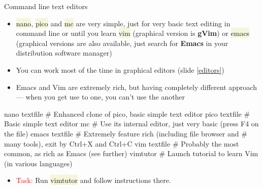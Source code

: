 \documentclass[compress, ucs, xelatex, 11pt, xcolor=svgnames, aspectratio=169,
	hyperref={
		bookmarks=true,
		unicode=true,
		colorlinks=true,
		pdftitle={Linux, command line and MetaCentrum},
		plainpages=false,
		pdfauthor={Vojtech Zeisek},
		pdfsubject={Course about use of Linux command line, writing shell scripts and using MetaCentrum of CESNET},
		pdfcreator={XeLaTeX},
		pdfkeywords={Linux, GNU, BASH, shell, command line, MetaCentrum},
		linkcolor=DarkRed, %
		anchorcolor=DarkBlue, %
		citecolor=Indigo, %
		filecolor=NavyBlue, %
		menucolor=DarkMagenta, %
		urlcolor=DarkBlue, %
		pdftex},
	url={hyphens, lowtilde} %
	]{beamer}
\renewcommand{\texttt}[1]{\colorbox{Beige}{{\ttfamily #1}}}
\renewcommand{\alert}[1]{\textcolor{red}{#1}}
\begin{document}
\begin{frame}[fragile]{Command line text editors}
	\begin{itemize}
		\item \texttt{nano}, \texttt{pico} and \texttt{mc} are very simple, just for very basic text editing in command line or until you learn \texttt{vim} (graphical version is \textbf{gVim}) or \texttt{emacs} (graphical versions are also available, just search for \textbf{Emacs} in your distribution software manager)
		\item You can work most of the time in graphical editors (slide \ref{editors})
		\item Emacs and Vim are extremely rich, but having completely different approach --- when you get use to one, you can't use the another
	\end{itemize}
	\vfill
	\begin{bashcode}
    nano textfile # Enhanced clone of pico, basic simple text editor
    pico textfile # Basic simple text editor
    mc # Use its internal editor, just very basic (press F4 on the file)
    emacs textfile # Extremely feature rich (including file browser and
                   # many tools), exit by Ctrl+X and Ctrl+C
    vim textfile # Probably the most common, as rich as Emacs (see further)
    vimtutor # Launch tutorial to learn Vim (in various languages)
	\end{bashcode}
	\vfill
	\begin{itemize}
		\item \alert{Task:} Run \texttt{vimtutor} and follow instructions there.
	\end{itemize}
\end{frame}
\end{document}
